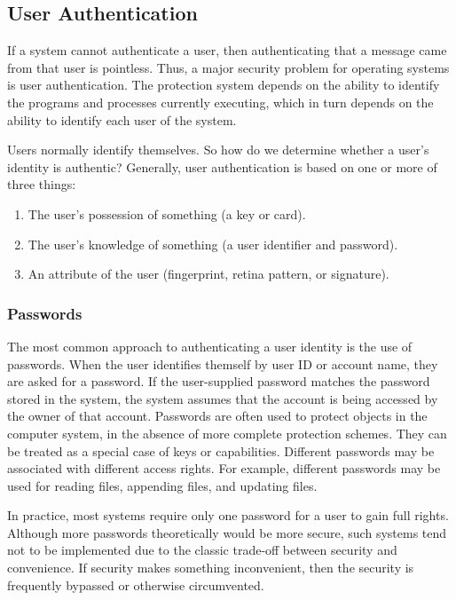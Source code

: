 \subsection{User Authentication}\label{subsec:User_Authentication}
If a system cannot authenticate a user, then authenticating that a message came from that user is pointless.
Thus, a major security problem for operating systems is user authentication.
The protection system depends on the ability to identify the programs and processes currently executing, which in turn depends on the ability to identify each user of the system.

Users normally identify themselves.
So how do we determine whether a user’s identity is authentic?
Generally, user authentication is based on one or more of three things:
\begin{enumerate}[noitemsep]
\item The user’s possession of something (a key or card).
\item The user’s knowledge of something (a user identifier and password).
\item An attribute of the user (fingerprint, retina pattern, or signature).
\end{enumerate}

\subsubsection{Passwords}\label{subsubsec:User_Authentication_Passwords}
The most common approach to authenticating a user identity is the use of passwords.
When the user identifies themself by user ID or account name, they are asked for a password.
If the user-supplied password matches the password stored in the system, the system assumes that the account is being accessed by the owner of that account.
Passwords are often used to protect objects in the computer system, in the absence of more complete protection schemes.
They can be treated as a special case of keys or capabilities.
Different passwords may be associated with different access rights.
For example, different passwords may be used for reading files, appending files, and updating files.

In practice, most systems require only one password for a user to gain full rights.
Although more passwords theoretically would be more secure, such systems tend not to be implemented due to the classic trade-off between security and convenience.
If security makes something inconvenient, then the security is frequently bypassed or otherwise circumvented.


